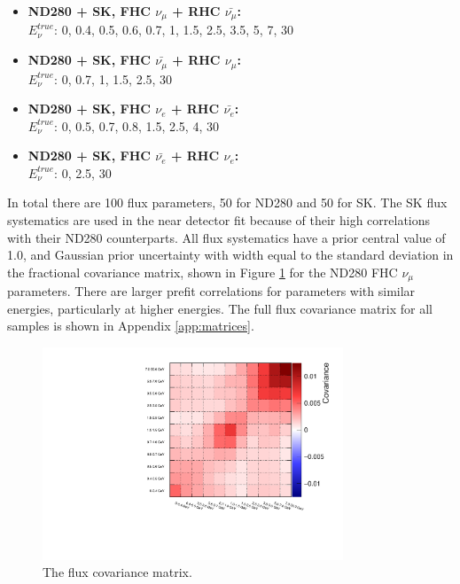\begin{itemize}

\item \textbf{ND280 + SK, FHC $\nu_\mu$ + RHC $\bar{\nu_\mu}$:}\\
$E^{true}_{\nu}$: 0, 0.4, 0.5, 0.6, 0.7, 1, 1.5, 2.5, 3.5, 5, 7, 30

\item \textbf{ND280 + SK, FHC $\bar{\nu_\mu}$ + RHC $\nu_\mu$:}\\
$E^{true}_{\nu}$: 0, 0.7, 1, 1.5, 2.5, 30

\item \textbf{ND280 + SK, FHC $\nu_e$ + RHC $\bar{\nu_e}$:}\\
$E^{true}_{\nu}$: 0, 0.5, 0.7, 0.8, 1.5, 2.5, 4, 30

\item \textbf{ND280 + SK, FHC $\bar{\nu_e}$ + RHC $\nu_e$:}\\
$E^{true}_{\nu}$: 0, 2.5, 30

\end{itemize}

In total there are 100 flux parameters, 50 for ND280 and 50 for SK. The SK flux systematics are used in the near detector fit because of their high correlations with their ND280 counterparts. All flux systematics have a prior central value of 1.0, and Gaussian prior uncertainty with width equal to the standard deviation in the fractional covariance matrix, shown in Figure \ref{fig:fluxcov1sample} for the ND280 FHC $\nu_\mu$ parameters. There are larger prefit correlations for parameters with similar energies, particularly at higher energies. The full flux covariance matrix for all samples is shown in Appendix \ref{app:matrices}.

\begin{figure}[!htbp]
\centering
\includegraphics*[width=0.8\textwidth,clip]{figs/fluxcov1sample}
\caption{The flux covariance matrix.}\label{fig:fluxcov1sample}
\end{figure}

